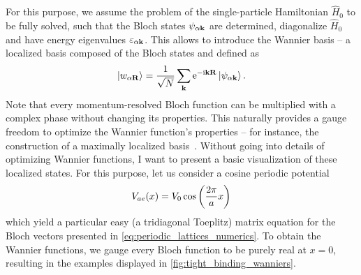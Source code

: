 For this purpose, we assume the problem of the single-particle Hamiltonian $\hat H_0$ to be fully solved, such that the Bloch states $\psi_{\alpha{\bf k}}$ are determined, diagonalize $\hat H_0$ and have energy eigenvalues $\varepsilon_{\alpha{\bf k}}$.
This allows to introduce the Wannier basis -- a localized basis composed of the Bloch states and defined as
\begin{align}
    \ket{w_{\alpha{\bf R}}} = \frac1{\sqrt N}\sum_{\bf k}\mathrm e^{-\mathrm i{\bf k}{\bf R}}\ket{\psi_{\alpha{\bf k}}}.
    \label{eq:wannier_states}
\end{align}
Note that every momentum-resolved Bloch function can be multiplied with a complex phase without changing its properties.
This naturally provides a gauge freedom to optimize the Wannier function's properties -- for instance, the construction of a maximally localized basis~\cite{Marzari2012}.
Without going into details of optimizing Wannier functions, I want to present a basic visualization of these localized states.
For this purpose, let us consider a cosine periodic potential
\begin{align}
    V_{ae}(x) = V_0\cos\left( \frac{2\pi}a x \right)
\end{align}
which yield a particular easy (a tridiagonal Toeplitz) matrix equation for the Bloch vectors presented in \cref{eq:periodic_lattices_numerics}.
To obtain the Wannier functions, we gauge every Bloch function to be purely real at $x=0$, resulting in the examples displayed in \cref{fig:tight_binding_wanniers}.
\\

